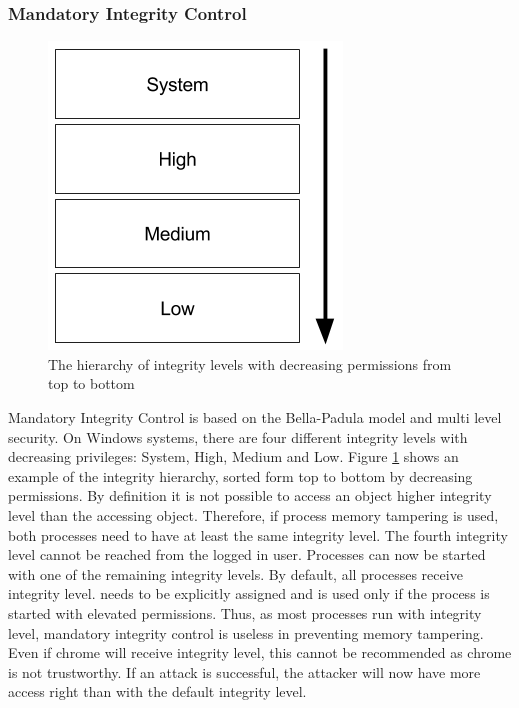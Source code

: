 \subsubsection{Mandatory Integrity Control}
\begin{figure}[h]
\centering
\includegraphics[scale=0.5]{sections/background/defenses/mic.png}
\caption{The hierarchy of integrity levels with decreasing permissions from top to bottom}
\label{fig:mic}
\end{figure}
Mandatory Integrity Control is based on the Bella-Padula model and multi level security. On Windows systems, there are four different integrity levels with decreasing privileges: System, High, Medium and Low. Figure \ref{fig:mic} shows an example of the integrity hierarchy, sorted form top to bottom by decreasing permissions. By definition it is not possible to access an object higher integrity level than the accessing object. Therefore, if process memory tampering is used, both processes need to have at least the same integrity level. The fourth integrity level  cannot be reached from the logged in user. Processes can now be started with one of the remaining integrity levels. By default, all processes receive  integrity level.  needs to be explicitly assigned and  is used only if the process is started with elevated permissions. Thus, as most processes run with  integrity level, mandatory integrity control is useless in preventing memory tampering. Even if chrome will receive  integrity level, this cannot be recommended as chrome is not trustworthy. If an attack is successful, the attacker will now have more access right than with the default  integrity level.